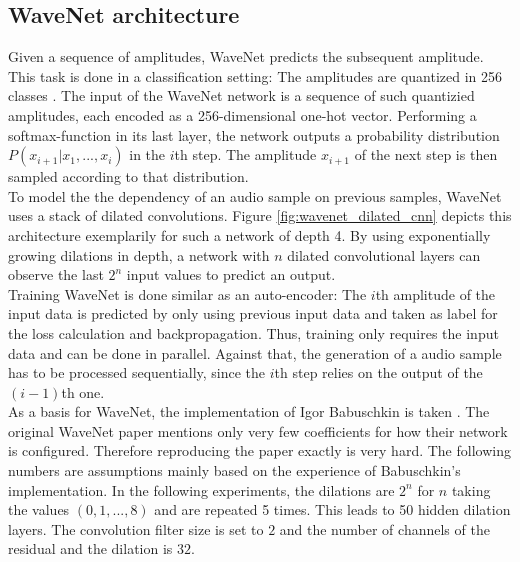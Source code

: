 \documentclass[10pt,conference,compsocconf]{IEEEtran}
\begin{document}
\subsection{WaveNet architecture}
Given a sequence of amplitudes, WaveNet predicts the subsequent amplitude. This task is done in a classification setting: The amplitudes are quantized in 256 classes \cite{itu1988711}. The input of the WaveNet network is a sequence of such quantizied amplitudes, each encoded as a 256-dimensional one-hot vector. Performing a softmax-function in its last layer, the network outputs a probability distribution $P(x_{i+1} | x_1, ..., x_i)$ in the $i$th step. The amplitude $x_{i+1}$ of the next step is then sampled according to that distribution.\\
To model the the dependency of an audio sample on previous samples, WaveNet uses a stack of dilated convolutions. Figure \ref{fig:wavenet_dilated_cnn} depicts this architecture exemplarily for such a network of depth 4. By using exponentially growing dilations in depth, a network with $n$ dilated convolutional layers can observe the last $2^n$ input values to predict an output.\\
Training WaveNet is done similar as an auto-encoder: The $i$th amplitude of the input data is predicted by only using previous input data and taken as label for the loss calculation and backpropagation. Thus, training only requires the input data and can be done in parallel. Against that, the generation of a audio sample has to be processed sequentially, since the $i$th step relies on the output of the $(i-1)$th one.\\
As a basis for WaveNet, the implementation of Igor Babuschkin is taken \cite{Babuschkin2016}. The original WaveNet paper mentions only very few coefficients for how their network is configured. Therefore reproducing the paper exactly is very hard. The following numbers are assumptions mainly based on the experience of Babuschkin's implementation. In the following experiments, the dilations are $2^n$ for $n$ taking the values $(0,1,...,8)$ and are repeated 5 times. This leads to 50 hidden dilation layers. The convolution filter size is set to $2$ and the number of channels of the residual and the dilation is $32$.\\
\end{document}
